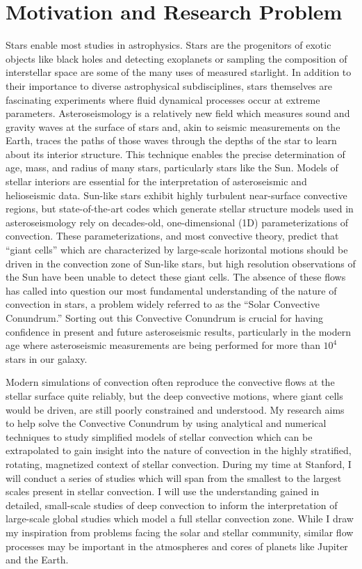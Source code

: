 \documentclass[aps, pre, onecolumn, nofootinbib, notitlepage, groupedaddress, amsfonts, amssymb, amsmath]{revtex4-1}
\begin{document}
\section*{Motivation and Research Problem}
\vspace{-13pt}
Stars enable most studies in astrophysics.
Stars are the progenitors of exotic objects like black holes and detecting exoplanets or sampling the composition of interstellar space are some of the many uses of measured starlight.
In addition to their importance to diverse astrophysical subdisciplines, stars themselves are fascinating experiments where fluid dynamical processes occur at extreme parameters.
Asteroseismology is a relatively new field which measures sound and gravity waves at the surface of stars and, akin to seismic measurements on the Earth, traces the paths of those waves through the depths of the star to learn about its interior structure.
This technique enables the precise determination of age, mass, and radius of many stars, particularly stars like the Sun.
Models of stellar interiors are essential for the interpretation of asteroseismic and helioseismic data.
Sun-like stars exhibit highly turbulent near-surface convective regions, but state-of-the-art codes which generate stellar structure models used in asteroseismology rely on decades-old, one-dimensional (1D) parameterizations of convection.
These parameterizations, and most convective theory, predict that ``giant cells'' which are characterized by large-scale horizontal motions should be driven in the convection zone of Sun-like stars, but high resolution observations of the Sun have been unable to detect these giant cells.
The absence of these flows has called into question our most fundamental understanding of the nature of convection in stars, a problem widely referred to as the ``Solar Convective Conundrum.''
Sorting out this Convective Conundrum is crucial for having confidence in present and future asteroseismic results, particularly in the modern age where asteroseismic measurements are being performed for more than $10^4$ stars in our galaxy.

Modern simulations of convection often reproduce the convective flows at the stellar surface quite reliably, but the deep convective motions, where giant cells would be driven, are still poorly constrained and understood.
My research aims to help solve the Convective Conundrum by using analytical and numerical techniques to study simplified models of stellar convection which can be extrapolated to gain insight into the nature of convection in the highly stratified, rotating, magnetized context of stellar convection.
During my time at Stanford, I will conduct a series of studies which will span from the smallest to the largest scales present in stellar convection.
I will use the understanding gained in detailed, small-scale studies of deep convection to inform the interpretation of large-scale global studies which model a full stellar convection zone.
While I draw my inspiration from problems facing the solar and stellar community, similar flow processes may be important in the atmospheres and cores of planets like Jupiter and the Earth. 
\end{document}
